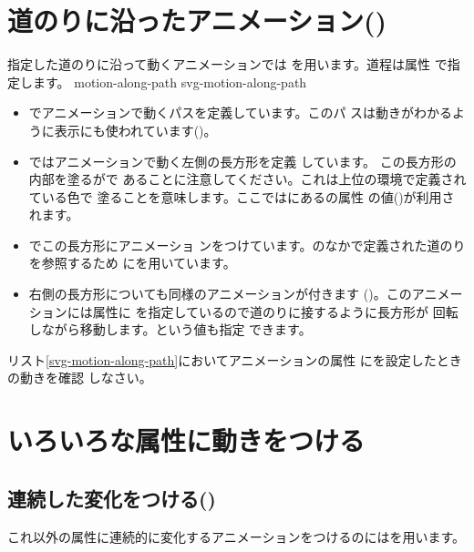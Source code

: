 \section{道のりに沿ったアニメーション()}
指定した道のりに沿って動くアニメーションでは
を用います。道程は属性 で指定します。
{motion-along-path}
   {svg-motion-along-path}
\begin{itemize}
 \item {}でアニメーションで動くパスを定義しています。このパ
       スは動きがわかるように表示にも使われています()。
 \item {}ではアニメーションで動く左側の長方形を定義
       しています。
       この長方形の内部を塗るがで
       あることに注意してください。これは上位の環境で定義されている色で
       塗ることを意味します。ここではにあるの属性
       の値()が利用されます。
 \item {}でこの長方形にアニメーショ
       ンをつけています。のなかで定義された道のりを参照するため
       にを用いています。
 \item 右側の長方形についても同様のアニメーションが付きます
       ()。このアニメーションには属性に
       を指定しているので道のりに接するように長方形が
       回転しながら移動します。という値も指定
       できます。
\end{itemize}
\begin{Problem}\upshape
 リスト\ref{svg-motion-along-path}においてアニメーションの属性
 にを設定したときの動きを確認
 しなさい。
\end{Problem}

\section{いろいろな属性に動きをつける}
\subsection{連続した変化をつける()}\label{animationbyanimate}
これ以外の属性に連続的に変化するアニメーションをつけるのにはを用います。
